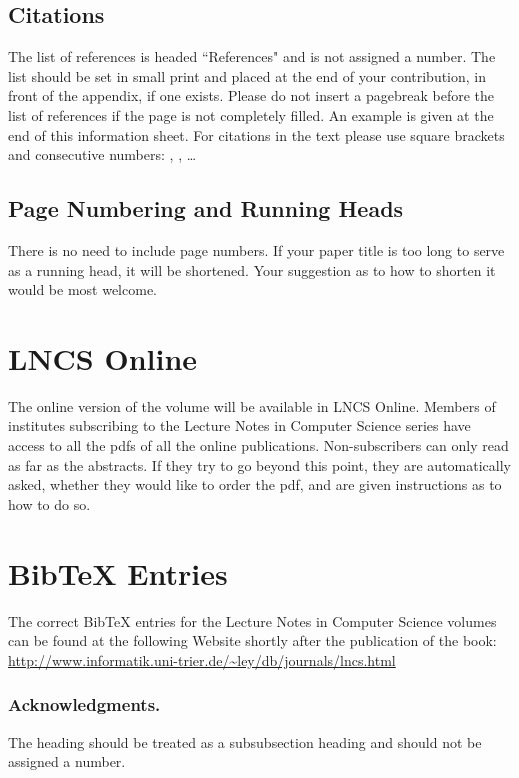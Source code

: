 \documentclass[runningheads]{llncs}
\begin{document}
\subsection{Citations}

The list of references is headed ``References" and is not assigned a
number. The list should be set in small print
and placed at the end of your contribution, in front of the appendix,
if one exists.
Please do not insert a pagebreak before the list of references if the
page is not completely filled.
An example is given at the
end of this information sheet. For citations in the text please use
square brackets and consecutive numbers: \cite{leeuw},
\cite{bru:car:pier}, \cite{mich} \dots

\subsection{Page Numbering and Running Heads}

There is no need to include page numbers. If your paper title is too
long to serve as a running head, it will be shortened. Your suggestion
as to how to shorten it would be most welcome.

\section{LNCS Online}

The online version of the volume will be available in LNCS Online.
Members of institutes subscribing to the Lecture Notes in Computer
Science series have access to all the pdfs of all the online
publications. Non-subscribers can only read as far as the abstracts. If
they try to go beyond this point, they are automatically asked, whether
they would like to order the pdf, and are given instructions as to how
to do so.

\section{BibTeX Entries}

The correct BibTeX entries for the Lecture Notes in Computer Science
volumes can be found at the following Website shortly after the
publication of the book:
\url{http://www.informatik.uni-trier.de/~ley/db/journals/lncs.html}

\subsubsection*{Acknowledgments.} The heading should be treated as a
subsubsection heading and should not be assigned a number.
\end{document}
